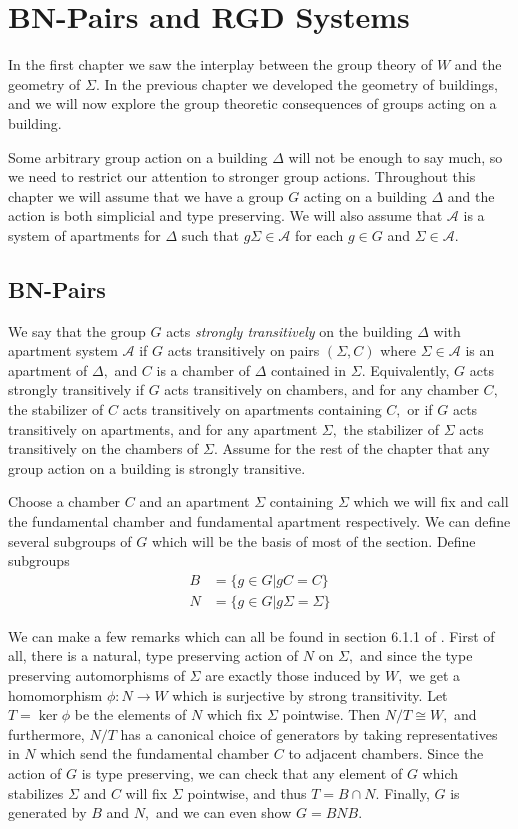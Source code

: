 \documentclass[class=book, crop=false,12 pt]{standalone}
\begin{document}
\chapter{BN-Pairs and RGD Systems}
\label{ch:rgd}
In the first chapter we saw the interplay between the group theory of $W$ and the geometry of $\Sigma.$ In the previous chapter we developed the geometry of buildings, and we will now explore the group theoretic consequences of groups acting on a building. 

Some arbitrary group action on a building $\Delta$ will not be enough to say much, so we need to restrict our attention to stronger group actions. Throughout this chapter we will assume that we have a group $G$ acting on a building $\Delta$ and the action is both simplicial and type preserving. We will also assume that $\mathcal{A}$ is a system of apartments for $\Delta$ such that $g\Sigma\in \mathcal{A}$ for each $g\in G$ and $\Sigma\in \mathcal{A}.$ 

\section{BN-Pairs}
We say that the group $G$ acts \emph{strongly transitively} on the building $\Delta$ with apartment system $\mathcal{A}$ if $G$ acts transitively on pairs $(\Sigma,C)$ where $\Sigma\in\mathcal{A}$ is an apartment of $\Delta,$ and $C$ is a chamber of $\Delta$ contained in $\Sigma.$ Equivalently, $G$ acts strongly transitively if $G$ acts transitively on chambers, and for any chamber $C,$ the stabilizer of $C$ acts transitively on apartments containing $C,$ or if $G$ acts transitively on apartments, and for any apartment $\Sigma,$ the stabilizer of $\Sigma$ acts transitively on the chambers of $\Sigma.$ Assume for the rest of the chapter that any group action on a building is strongly transitive.

Choose a chamber $C$ and an apartment $\Sigma$ containing $\Sigma$ which we will fix and call the fundamental chamber and fundamental apartment respectively. We can define several subgroups of $G$ which will be the basis of most of the section. Define subgroups
\begin{align*}
	B&=\{g\in G|gC=C\}\\
	N&=\{g\in G|g\Sigma=\Sigma\}
\end{align*}

We can make a few remarks which can all be found in section 6.1.1 of \cite{buildings}. First of all, there is a natural, type preserving action of $N$ on $\Sigma,$ and since the type preserving automorphisms of $\Sigma$ are exactly those induced by $W,$ we get a homomorphism $\phi:N\to W$ which is surjective by strong transitivity. Let $T=\ker \phi$ be the elements of $N$ which fix $\Sigma$ pointwise. Then $N/T\cong W,$ and furthermore, $N/T$ has a canonical choice of generators by taking representatives in $N$ which send the fundamental chamber $C$ to adjacent chambers. Since the action of $G$ is type preserving, we can check that any element of $G$ which stabilizes $\Sigma$ and $C$ will fix $\Sigma$ pointwise, and thus $T=B\cap N.$ Finally, $G$ is generated by $B$ and $N,$ and we can even show $G=BNB.$
\end{document}

